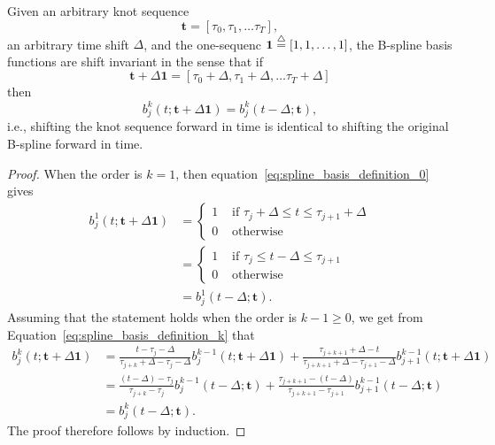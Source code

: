 \begin{lemma} \label{lem:basis_are_shift_invariant}
Given an arbitrary knot sequence
\[
\mathbf{t} = [\tau_0, \tau_1, \dots \tau_T],
\]
an arbitrary time shift $\Delta$, and the one-sequenc $\mathbf{1}\stackrel{\triangle}{=}[1, 1, \dots, 1]$, the B-spline basis functions are shift invariant in the sense that
if 
\[
\mathbf{t} + \Delta\mathbf{1} = [\tau_0+\Delta, \tau_1+\Delta, \dots \tau_T+\Delta]
\]
then
\[
b_j^k(t; \mathbf{t}+\Delta\mathbf{1}) = b_j^k(t-\Delta; \mathbf{t}),
\]
i.e., shifting the knot sequence forward in time is identical to shifting the original B-spline forward in time.
\end{lemma}
\begin{proof}
When the order is $k=1$, then equation~\eqref{eq:spline_basis_definition_0} gives
\begin{align*}
	b_j^1(t; \mathbf{t}+\Delta\mathbf{1}) &= \begin{cases} 1 & \text{~if~} \tau_j+\Delta \leq t \leq \tau_{j+1}+\Delta \\ 
 									 				   0 & \text{~otherwise} 
 					   					 \end{cases} \\
 					   				   &= \begin{cases} 1 & \text{~if~} \tau_j \leq t-\Delta \leq \tau_{j+1} \\ 
 									 				   0 & \text{~otherwise} 
 					   					 \end{cases} \\ 	
 					   				   &= b_j^1(t-\Delta; \mathbf{t}).
\end{align*}
Assuming that the statement holds when the order is $k-1\geq 0$, we get from 
Equation~\eqref{eq:spline_basis_definition_k} that
\begin{align*}
b_j^k(t; \mathbf{t}+\Delta\mathbf{1}) &= \frac{t-\tau_j-\Delta}{\tau_{j+k}+\Delta-
\tau_j-\Delta} b_j^{k-1}(t; \mathbf{t}+\Delta\mathbf{1}) + \frac{\tau_{j+k+1}+\Delta-t}{\tau_{j+k+1}+\Delta-\tau_{j+1}-\Delta} b_{j+1}^{k-1}(t; \mathbf{t}+\Delta\mathbf{1}) \\
&= \frac{(t-\Delta)-\tau_j}{\tau_{j+k}-
\tau_j} b_j^{k-1}(t-\Delta; \mathbf{t}) + \frac{\tau_{j+k+1}-(t-\Delta)}{\tau_{j+k+1}-\tau_{j+1}} b_{j+1}^{k-1}(t-\Delta; \mathbf{t}) \\
&= b_j^k(t-\Delta; \mathbf{t}).
\end{align*}
The proof therefore follows by induction.
\end{proof}


